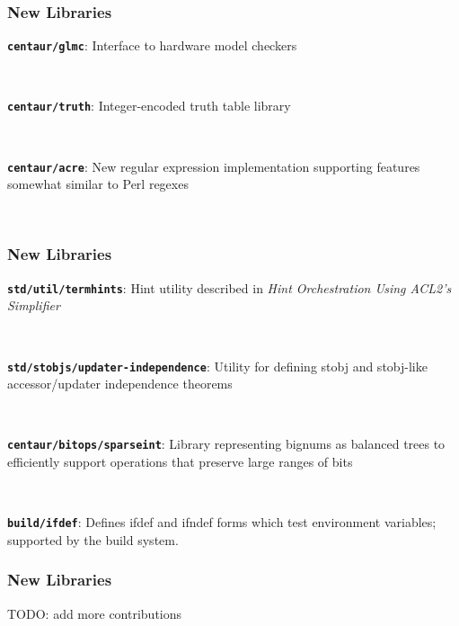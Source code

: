\documentclass{beamer}
\newcommand{\code}[1]{\texttt{#1}}
\newcommand{\bookpath}[1]{\textbf{\code{#1}}}
\newcommand{\newlibtitle}{\frametitle{New Libraries}}
\begin{document}

\begin{frame}

\newlibtitle

\bookpath{centaur/glmc}:
Interface to hardware model checkers

\

\bookpath{centaur/truth}:
Integer-encoded truth table library

\

\bookpath{centaur/acre}:
New regular expression implementation supporting features somewhat similar to Perl regexes

\

\end{frame}


\begin{frame}

\newlibtitle

\bookpath{std/util/termhints}:
Hint utility described in \textit{Hint Orchestration Using ACL2's Simplifier}

\

\bookpath{std/stobjs/updater-independence}:
Utility for defining stobj and stobj-like accessor/updater independence theorems

\

\bookpath{centaur/bitops/sparseint}:
Library representing bignums as balanced trees to efficiently support
operations that preserve large ranges of bits

\

\bookpath{build/ifdef}:
Defines ifdef and ifndef forms which test environment variables;
supported by the build system.

\end{frame}


\begin{frame}

\newlibtitle

TODO: add more contributions

\end{frame}

\end{document}
